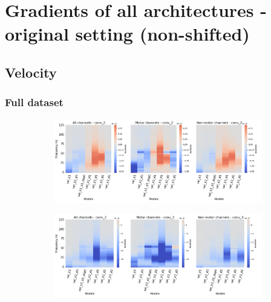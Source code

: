 \chapter{Gradients of all architectures - original setting (non-shifted)}\label{appendixA}


\section*{Velocity}\label{sec:velocity-appendixA}

\subsection*{Full dataset}\label{subsec:vel-full-dataset-appendixA}
\begin{figure}[!htpb]
\centering
\begin{subfigure}[a]{\textwidth}
   \includegraphics[width=1\linewidth]{img/appendix/A/conv-2/m/vel-model-gradients-all_kinds}
   \caption{}
   \label{fig:vel-full-grads-conv2}
\end{subfigure}

\begin{subfigure}[b]{\textwidth}
   \includegraphics[width=1\linewidth]{img/appendix/A/conv-3/m/vel-model-gradients-all_kinds}
   \caption{}
   \label{fig:vel-full-grads-conv3}
\end{subfigure}


\end{figure}
